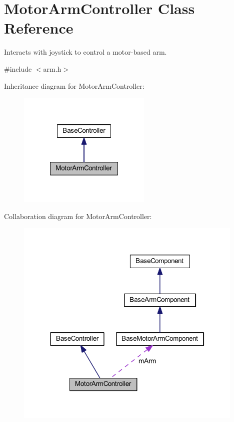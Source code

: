 \hypertarget{class_motor_arm_controller}{\section{\-Motor\-Arm\-Controller \-Class \-Reference}
\label{class_motor_arm_controller}
}


\-Interacts with joystick to control a motor-\/based arm.  




{\ttfamily \#include $<$arm.\-h$>$}



\-Inheritance diagram for \-Motor\-Arm\-Controller\-:\nopagebreak
\begin{figure}[H]
\begin{center}
\leavevmode
\includegraphics[width=180pt]{class_motor_arm_controller__inherit__graph}
\end{center}
\end{figure}


\-Collaboration diagram for \-Motor\-Arm\-Controller\-:\nopagebreak
\begin{figure}[H]
\begin{center}
\leavevmode
\includegraphics[width=309pt]{class_motor_arm_controller__coll__graph}
\end{center}
\end{figure}

